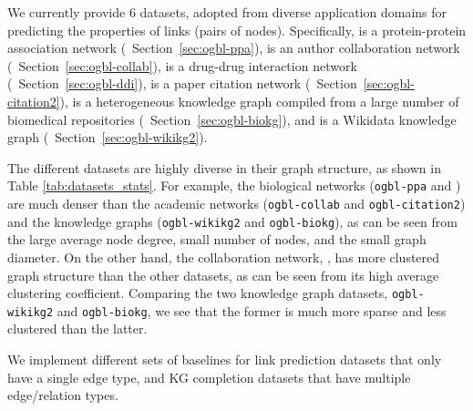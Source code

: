 
We currently provide 6 datasets, adopted from diverse application domains for predicting the properties of links (pairs of nodes).
Specifically,  is a protein-protein association network \citep{szklarczyk2019string} (\cf~Section~\ref{sec:ogbl-ppa}), 
 is an author collaboration network \citep{wang2020mag} (\cf~Section~\ref{sec:ogbl-collab}),
 is a drug-drug interaction network \citep{wishart2018drugbank} (\cf~Section~\ref{sec:ogbl-ddi}),
 is a paper citation network \citep{wang2020mag} (\cf~Section~\ref{sec:ogbl-citation2}),
 is a heterogeneous knowledge graph compiled from a large number of biomedical repositories  (\cf~Section~\ref{sec:ogbl-biokg}),
and  is a Wikidata knowledge graph \citep{vrandevcic2014wikidata} (\cf~Section~\ref{sec:ogbl-wikikg2}).


The different datasets are highly diverse in their graph structure, as shown in Table \ref{tab:datasets_stats}.
For example, the biological networks (\texttt{ogbl-ppa} and ) are much denser than the academic networks (\texttt{ogbl-collab} and \texttt{ogbl-citation2}) and the knowledge graphs (\texttt{ogbl-wikikg2} and \texttt{ogbl-biokg}), as can be seen from the large average node degree, small number of nodes, and the small graph diameter.
On the other hand, the collaboration network, , has more clustered graph structure than the other datasets, as can be seen from its high average clustering coefficient.
Comparing the two knowledge graph datasets, \texttt{ogbl-wikikg2} and \texttt{ogbl-biokg}, we see that the former is much more sparse and less clustered than the latter.


We implement different sets of baselines for link prediction datasets that only have a single edge type, and KG completion datasets that have multiple edge/relation types.

